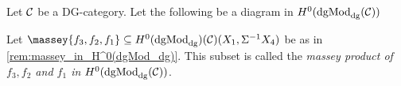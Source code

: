 \begin{definition}
    \label{def:massey_product_H^0(dgMod_dg(C))}
    Let \( {\mathcal{C}} \) be a DG-category. Let the following be a diagram in \( H^0(\operatorname{dgMod}_{\operatorname{dg}}({\mathcal{C}})) \)
    \begin{center}
    \end{center}
    Let \( \massey{f_3, f_2, f_1} \subseteq H^0(\dgMod_{\dg})(\Cc)(X_1, \Sigma^{-1} X_4) \) be as in \autoref{rem:massey_in_H^0(dgMod_dg)}. This subset is called the \emph{massey product of \( f_3, f_2 \) and \( f_1 \) in \( H^0(\operatorname{dgMod}_{\operatorname{dg}}({\mathcal{C}})) \)}.
\end{definition}

